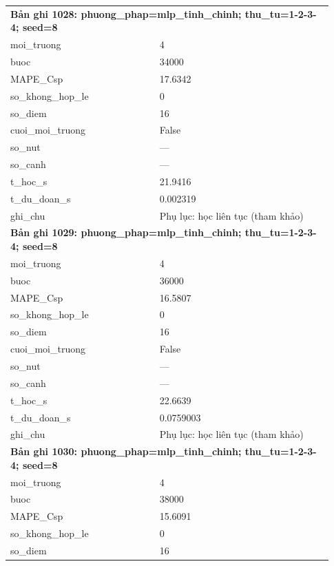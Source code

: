 \begin{longtable}{p{0.43\linewidth}p{0.50\linewidth}}
\midrule
\multicolumn{2}{p{0.95\linewidth}}{\textbf{Bản ghi 1028: phuong\_phap=mlp\_tinh\_chinh; thu\_tu=1-2-3-4; seed=8}} \\
moi\_\allowbreak truong & 4 \\
buoc & 34000 \\
MAPE\_\allowbreak Csp & 17.6342 \\
so\_\allowbreak khong\_\allowbreak hop\_\allowbreak le & 0 \\
so\_\allowbreak diem & 16 \\
cuoi\_\allowbreak moi\_\allowbreak truong & False \\
so\_\allowbreak nut & — \\
so\_\allowbreak canh & — \\
t\_\allowbreak hoc\_\allowbreak s & 21.9416 \\
t\_\allowbreak du\_\allowbreak doan\_\allowbreak s & 0.002319 \\
ghi\_\allowbreak chu & Phụ lục: học liên tục (tham khảo) \\
\midrule
\multicolumn{2}{p{0.95\linewidth}}{\textbf{Bản ghi 1029: phuong\_phap=mlp\_tinh\_chinh; thu\_tu=1-2-3-4; seed=8}} \\
moi\_\allowbreak truong & 4 \\
buoc & 36000 \\
MAPE\_\allowbreak Csp & 16.5807 \\
so\_\allowbreak khong\_\allowbreak hop\_\allowbreak le & 0 \\
so\_\allowbreak diem & 16 \\
cuoi\_\allowbreak moi\_\allowbreak truong & False \\
so\_\allowbreak nut & — \\
so\_\allowbreak canh & — \\
t\_\allowbreak hoc\_\allowbreak s & 22.6639 \\
t\_\allowbreak du\_\allowbreak doan\_\allowbreak s & 0.0759003 \\
ghi\_\allowbreak chu & Phụ lục: học liên tục (tham khảo) \\
\midrule
\multicolumn{2}{p{0.95\linewidth}}{\textbf{Bản ghi 1030: phuong\_phap=mlp\_tinh\_chinh; thu\_tu=1-2-3-4; seed=8}} \\
moi\_\allowbreak truong & 4 \\
buoc & 38000 \\
MAPE\_\allowbreak Csp & 15.6091 \\
so\_\allowbreak khong\_\allowbreak hop\_\allowbreak le & 0 \\
so\_\allowbreak diem & 16 \\

\end{longtable}
